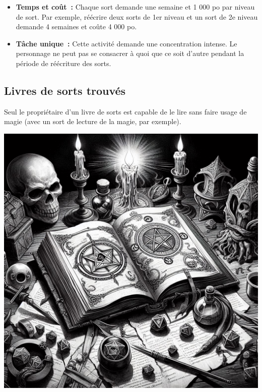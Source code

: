 \begin{itemize}
  \item \textbf{Temps et coût~:} Chaque sort demande une semaine et 1 000 po
  par niveau de sort. Par exemple, réécrire deux sorts de 1er niveau et
  un sort de 2e niveau demande 4 semaines et coûte 4 000 po.
  \item \textbf{Tâche unique~:} Cette activité demande une concentration
  intense. Le personnage ne peut pas se consacrer à quoi que ce soit
  d'autre pendant la période de réécriture des sorts.
\end{itemize}

\subsection{Livres de sorts trouvés}\label{livres-de-sorts-trouvuxe9s}

Seul le propriétaire d'un livre de sorts est capable de le lire sans
faire usage de magie (avec un sort de lecture de la magie, par exemple).

\begin{center}
  \includegraphics[width=0.75\columnwidth]{img/spellbook.jpg}
\end{center}
